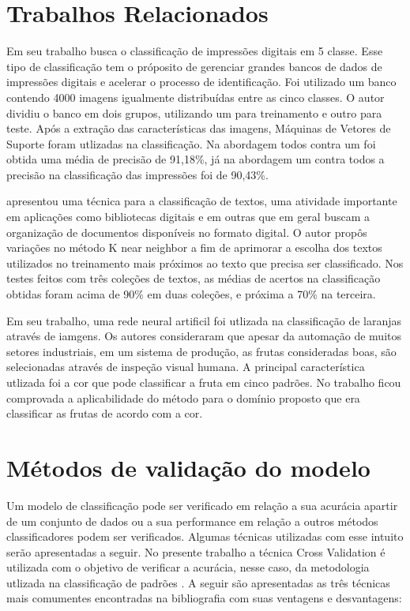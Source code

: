 \section{Trabalhos Relacionados}
Em seu trabalho  busca o classificação de impressões digitais em 5 classe. Esse tipo de classificação tem o próposito de gerenciar grandes bancos de dados de impressões digitais e acelerar o processo de identificação. Foi utilizado um banco contendo 4000 imagens igualmente distribuídas entre as cinco classes. O autor dividiu o banco em dois grupos, utilizando um para treinamento e outro para teste. Após a extração das características das imagens, Máquinas de Vetores de Suporte foram utlizadas na classificação. Na abordagem todos contra um foi obtida uma média de precisão de 91,18\%, já na abordagem um contra todos a precisão na classificação das impressões foi de 90,43\%.

 apresentou uma técnica para a classificação de textos, uma atividade importante em aplicações como bibliotecas digitais e em outras que em geral buscam a organização de documentos disponíveis no formato digital. O autor propôs variações no método K near neighbor a fim de  aprimorar a escolha dos textos utilizados no treinamento mais próximos ao texto que precisa ser classificado. Nos testes feitos com três coleções de textos, as médias de acertos na classificação obtidas foram acima de 90\% em duas coleções, e próxima a 70\% na terceira.

Em seu trabalho,  uma rede neural artificil foi utlizada na classificação de laranjas através de iamgens. Os autores consideraram que apesar da automação de muitos setores industriais, em um sistema de produção, as frutas consideradas boas, são selecionadas através de inspeção visual humana. A principal característica utlizada foi a cor que pode classificar a fruta em cinco padrões. No trabalho ficou comprovada a aplicabilidade do método para o domínio proposto que era classificar as frutas de acordo com a cor.

\section{Métodos de validação do modelo}
Um modelo de classificação pode ser verificado em relação a sua acurácia apartir de um conjunto de dados ou a sua performance em relação a outros métodos classificadores podem ser verificados. Algumas técnicas utilizadas com esse intuito serão apresentadas a seguir. No presente trabalho a técnica Cross Validation é utilizada com o objetivo de verificar a acurácia, nesse caso, da metodologia utlizada na classificação de padrões \cite{Kohavi95Cross} \cite{Baldisserotto05Validacao}.
A seguir são apresentadas as três técnicas mais comumentes encontradas na bibliografia com suas ventagens e desvantagens:


